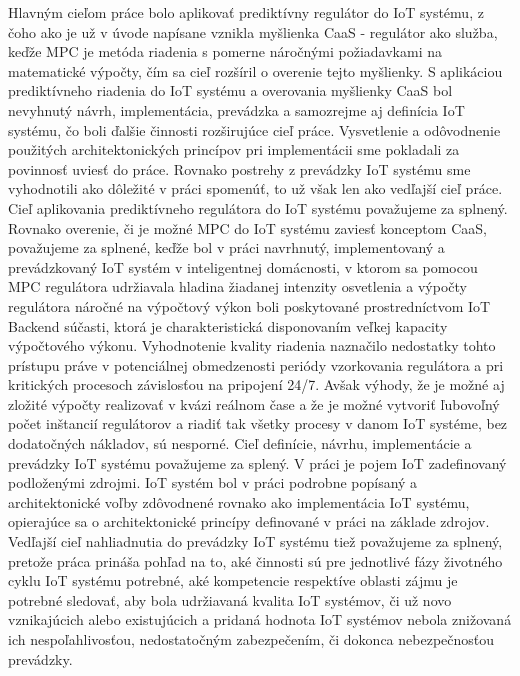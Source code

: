 Hlavným cieľom práce bolo aplikovať prediktívny regulátor do IoT systému, z čoho ako je už v úvode napísane vznikla myšlienka CaaS - regulátor ako služba, keďže MPC je metóda riadenia s pomerne náročnými požiadavkami na matematické výpočty, čím sa cieľ rozšíril o overenie tejto myšlienky. S aplikáciou prediktívneho riadenia do IoT systému a overovania myšlienky CaaS bol nevyhnutý návrh, implementácia, prevádzka a samozrejme aj definícia IoT systému, čo boli ďalšie činnosti rozširujúce cieľ práce. Vysvetlenie a odôvodnenie použitých architektonických princípov pri implementácii sme pokladali za povinnosť uviesť do práce. Rovnako postrehy z prevádzky IoT systému sme vyhodnotili ako dôležité v práci spomenúť, to už však len ako vedľajší cieľ práce.\\
\indent Cieľ aplikovania prediktívneho regulátora do IoT systému považujeme za splnený. Rovnako overenie, či je možné MPC do IoT systému zaviesť konceptom CaaS, považujeme za splnené, keďže bol v práci navrhnutý, implementovaný a prevádzkovaný IoT systém v inteligentnej domácnosti, v ktorom sa pomocou MPC regulátora udržiavala hladina žiadanej intenzity osvetlenia a výpočty regulátora náročné na výpočtový výkon boli poskytované prostredníctvom IoT Backend súčasti, ktorá je charakteristická disponovaním veľkej kapacity výpočtového výkonu. Vyhodnotenie kvality riadenia naznačilo nedostatky tohto prístupu práve v potenciálnej obmedzenosti periódy vzorkovania regulátora a pri kritických procesoch závislosťou na pripojení 24/7. Avšak výhody, že je možné aj zložité výpočty realizovať v kvázi reálnom čase a že je možné vytvoriť ľubovoľný počet inštancií regulátorov a riadiť tak všetky procesy v danom IoT systéme, bez dodatočných nákladov, sú nesporné. Cieľ definície, návrhu, implementácie a prevádzky IoT systému považujeme za splený. V práci je pojem IoT zadefinovaný podloženými zdrojmi. IoT systém bol v práci podrobne popísaný a architektonické voľby zdôvodnené rovnako ako implementácia IoT systému, opierajúce sa o architektonické princípy definované v práci na základe zdrojov. Vedľajší cieľ nahliadnutia do prevádzky IoT systému tiež považujeme za splnený, pretože práca prináša pohľad na to, aké činnosti sú pre jednotlivé fázy životného cyklu IoT systému potrebné, aké kompetencie respektíve oblasti zájmu je potrebné sledovať, aby bola udržiavaná kvalita IoT systémov, či už novo vznikajúcich alebo existujúcich a pridaná hodnota IoT systémov nebola znižovaná ich nespoľahlivosťou, nedostatočným zabezpečením, či dokonca nebezpečnosťou prevádzky.
